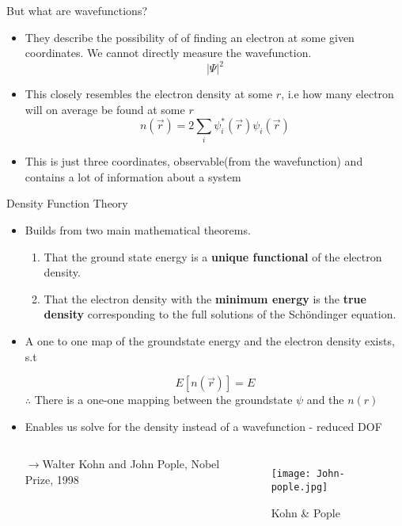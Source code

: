 \documentclass[10pt, aspectratio=169]{beamer}
\begin{document}
\begin{frame}{But what are wavefunctions?}
\begin{itemize}
    \item They describe the possibility of of finding an electron at some given coordinates. We  cannot directly measure the wavefunction.
    \begin{equation}
        |\Psi|^2
    \end{equation}
    \item This closely resembles the electron density at some $r$, i.e how many electron will on average be found at some $r$
    \begin{equation}
        n(\vec r) = 2\sum_i \psi_i^*(\vec r)\psi_i(\vec r)
    \end{equation}
    \item[\rightarrow] This is just three coordinates, observable(from the wavefunction) and contains a lot of information about a system

\end{itemize}
    
\end{frame}

\begin{frame}{Density Function Theory}
\begin{itemize}
    \item Builds from two main mathematical theorems.
    \begin{center}
    \begin{enumerate}
        \item{That the ground state energy is a \textbf{unique functional}  of the electron density.}
        \item That the electron density with the \textbf{minimum energy} is the \textbf{true density} corresponding to the full solutions of the Sch\"ondinger equation.
    
    \end{enumerate}
    \end{center}
    
    \item A one to one map of the groundstate energy and the electron density exists, s.t

    \begin{equation}
        E[n(\vec r)] = E
    \end{equation}
    $\therefore$ There is a one-one mapping between the groundstate $\psi$ and the $n(r)$
    \item Enables us solve for the density instead of a wavefunction - reduced DOF

    \begin{columns}
        \color{0.30\linewidth}
        $\rightarrow$Walter Kohn and John Pople, Nobel Prize, 1998
        \begin{figure}
            \centering
            \texttt{[image: John-pople.jpg]}
            \caption*{Kohn \& Pople}
            \label{fig:enter-label}
        \end{figure}
    \end{columns}
\end{itemize} 
\end{frame}
\end{document}
